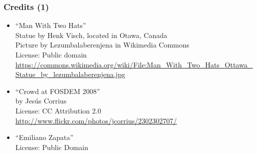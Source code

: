 \documentclass[17pt,aspectratio=169,hyperref=pdfusetitle]{beamer}
\begin{document}

\begin{frame}
\frametitle{Credits (1)}

\begin{itemize}
\item {\small ``Man With Two Hats'' \\
  Statue by Henk Visch, located in Otawa, Canada \\
  Picture by Lezumbalaberenjena in Wikimedia Commons \\
  License: Public domain \\}
  {\footnotesize \url{https://commons.wikimedia.org/wiki/File:Man_With_Two_Hats_Ottawa_Statue_by_lezumbalaberenjena.jpg}}

\item {\small ``Crowd at FOSDEM 2008'' \\
  by Jesús Corrius \\
  License: CC Attribution 2.0 \\}
  {\footnotesize \url{http://www.flickr.com/photos/jcorrius/2302302707/}}

\item {\small ``Emiliano Zapata'' \\
  License: Public Domain} \\

\end{itemize}

\end{frame}



\end{document}
